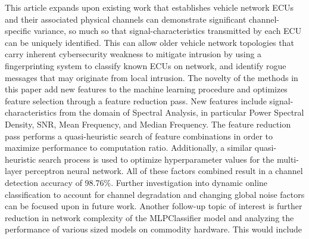 \documentclass[conference]{IEEEtran}
\begin{document}
This article expands upon existing work that establishes vehicle network ECUs and their associated physical channels can demonstrate significant channel-specific variance, so much so that signal-characteristics transmitted by each ECU can be uniquely identified. This can allow older vehicle network topologies that carry inherent cybersecurity weakness to mitigate intrusion by using a fingerprinting system to classify known ECUs on network, and identify rogue messages that may originate from local intrusion. The novelty of the methods in this paper add new features to the machine learning procedure and optimizes feature selection through a feature reduction pass. New features include signal-characteristics from the domain of Spectral Analysis, in particular Power Spectral Density, SNR, Mean Frequency, and Median Frequency. The feature reduction pass performs a quasi-heuristic search of feature combinations in order to maximize performance to computation ratio. Additionally, a similar quasi-heuristic search process is used to optimize hyperparameter values for the multi-layer perceptron neural network. All of these factors combined result in a channel detection accuracy of 98.76\%. Further investigation into dynamic online classification to account for channel degradation and changing global noise factors can be focused upon in future work. Another follow-up topic of interest is further reduction in network complexity of the MLPClassifier model and analyzing the performance of various sized models on commodity hardware. This would include

\newpage
\pagebreak


%

\end{document}
